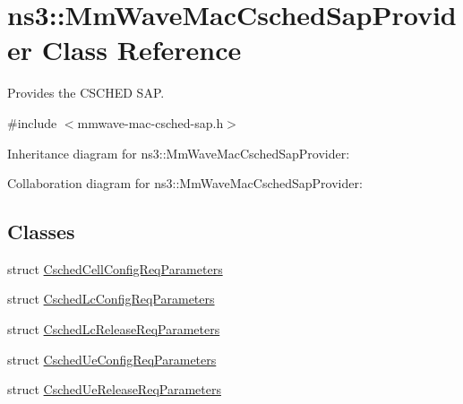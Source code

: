 \hypertarget{classns3_1_1MmWaveMacCschedSapProvider}{}\section{ns3\+:\+:Mm\+Wave\+Mac\+Csched\+Sap\+Provider Class Reference}
\label{classns3_1_1MmWaveMacCschedSapProvider}


Provides the C\+S\+C\+H\+ED S\+AP.  




{\ttfamily \#include $<$mmwave-\/mac-\/csched-\/sap.\+h$>$}



Inheritance diagram for ns3\+:\+:Mm\+Wave\+Mac\+Csched\+Sap\+Provider\+:


Collaboration diagram for ns3\+:\+:Mm\+Wave\+Mac\+Csched\+Sap\+Provider\+:
\subsection*{Classes}
\begin{DoxyCompactItemize}
\item 
struct \hyperlink{structns3_1_1MmWaveMacCschedSapProvider_1_1CschedCellConfigReqParameters}{Csched\+Cell\+Config\+Req\+Parameters}
\item 
struct \hyperlink{structns3_1_1MmWaveMacCschedSapProvider_1_1CschedLcConfigReqParameters}{Csched\+Lc\+Config\+Req\+Parameters}
\item 
struct \hyperlink{structns3_1_1MmWaveMacCschedSapProvider_1_1CschedLcReleaseReqParameters}{Csched\+Lc\+Release\+Req\+Parameters}
\item 
struct \hyperlink{structns3_1_1MmWaveMacCschedSapProvider_1_1CschedUeConfigReqParameters}{Csched\+Ue\+Config\+Req\+Parameters}
\item 
struct \hyperlink{structns3_1_1MmWaveMacCschedSapProvider_1_1CschedUeReleaseReqParameters}{Csched\+Ue\+Release\+Req\+Parameters}
\end{DoxyCompactItemize}
